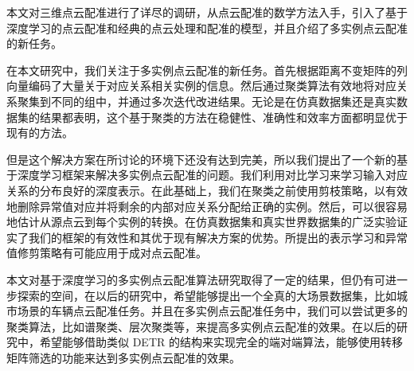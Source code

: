 %
%
%
%
%
%

\begin{conclusion}
  本文对三维点云配准进行了详尽的调研，从点云配准的数学方法入手，引入了基于深度学习的点云配准和经典的点云处理和配准的模型，并且介绍了多实例点云配准的新任务。

  在本文研究中，我们关注于多实例点云配准的新任务。首先根据距离不变矩阵的列向量编码了大量关于对应关系相关实例的信息。然后通过聚类算法有效地将对应关系聚集到不同的组中，并通过多次迭代改进结果。无论是在仿真数据集还是真实数据集的结果都表明，这个基于聚类的方法在稳健性、准确性和效率方面都明显优于现有的方法。
  
  但是这个解决方案在所讨论的环境下还没有达到完美，所以我们提出了一个新的基于深度学习框架来解决多实例点云配准的问题。我们利用对比学习来学习输入对应关系的分布良好的深度表示。在此基础上，我们在聚类之前使用剪枝策略，以有效地删除异常值对应并将剩余的内部对应关系分配给正确的实例。然后，可以很容易地估计从源点云到每个实例的转换。在仿真数据集和真实世界数据集的广泛实验证实了我们的框架的有效性和其优于现有解决方案的优势。所提出的表示学习和异常值修剪策略有可能应用于成对点云配准。

  本文对基于深度学习的多实例点云配准算法研究取得了一定的结果，但仍有可进一步探索的空间，在以后的研究中，希望能够提出一个全真的大场景数据集，比如城市场景的车辆点云配准任务。并且在多实例点云配准任务中，我们可以尝试更多的聚类算法，比如谱聚类、层次聚类等，来提高多实例点云配准的效果。在以后的研究中，希望能够借助类似 DETR \cite{carion2020end} 的结构来实现完全的端对端算法，能够使用转移矩阵筛选的功能来达到多实例点云配准的效果。
\end{conclusion}

